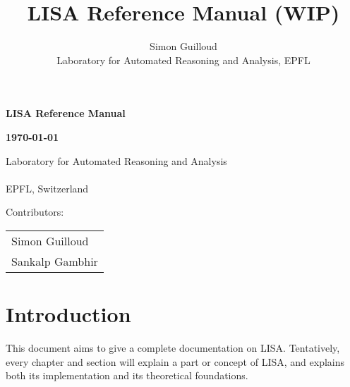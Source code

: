 \documentclass[11pt,b5paper,fullpage]{book}
\title{LISA Reference Manual (WIP)}
\author{Simon Guilloud\\Laboratory for Automated Reasoning and Analysis, EPFL}
\date{}
\begin{document}
 


\begin{titlepage}
\sf

    \begin{center}
        \vspace*{1cm}
 
        \textbf{\Huge LISA Reference Manual}
             
        \vspace{1.5cm}
        
        
        \textbf{\large \today}
             
        \vspace{1.5cm}
 
        {\Large Laboratory for Automated Reasoning and Analysis \\ \ \\ EPFL, Switzerland}

        \vspace{1.5cm}

        \date{}

    \end{center}

   \vfill

   \begin{flushright}
    \begin{minipage}{15em}
      \Large
         Contributors: \\[1ex]
        \hspace*{3em} \begin{tabular}{l}
         Simon Guilloud\\
         Sankalp Gambhir
        \end{tabular}
    \end{minipage}
   \end{flushright}
             
 \end{titlepage}
\chapter*{Introduction}

This document aims to give a complete documentation on LISA. Tentatively, every chapter and section will explain a part or concept of LISA, and explains both its implementation and its theoretical foundations. 

\tableofcontents













\end{document}
